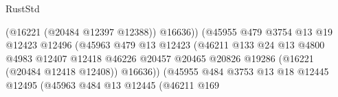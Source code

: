 \begin{lexlean}{RustStd}
\begin{coremodule}
                                                        (@16221 (@20484 @12397 @12388))
                                                        @16636))
                                                    (@45955
                                                      @479
                                                      @3754
                                                      @13
                                                      @19
                                                      @12423
                                                      @12496
                                                      (@45963
                                                        @479
                                                        @13
                                                        @12423
                                                        (@46211
                                                          @133
                                                          @24
                                                          @13
                                                          @4800
                                                          @4983
                                                          @12407
                                                          @12418
                                                          @46226
                                                          @20457
                                                          @20465
                                                          @20826
                                                          @19286
                                                          (@16221 (@20484 @12418 @12408))
                                                          @16636))
                                                      (@45955
                                                        @484
                                                        @3753
                                                        @13
                                                        @18
                                                        @12445
                                                        @12495
                                                        (@45963
                                                          @484
                                                          @13
                                                          @12445
                                                          (@46211
                                                            @169

\end{coremodule}
\end{lexlean}
